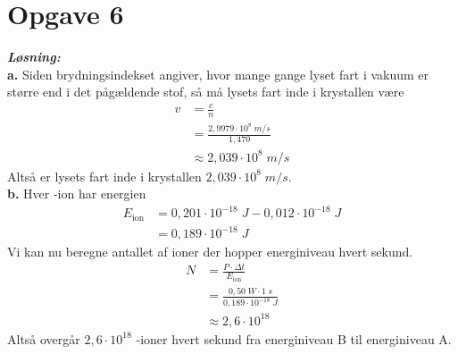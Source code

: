 \documentclass{report}
\newcommand{\sol}{\setlength{\parindent}{0cm}\textbf{\textit{Løsning:}}\setlength{\parindent}{1cm}}
\begin{document}
\section*{Opgave 6}
\sol \\
\textbf{a.}
Siden brydningsindekset angiver, hvor mange gange lyset fart i vakuum er større end i det pågældende stof, så må lysets fart inde i krystallen være 
\begin{equation*}
\begin{split}
  v&=\frac{c}{n}\\ 
  &=\frac{2,9979 \cdot 10^8 \;\unit{m/s} }{1,470}\\ 
  &\approx 2,039 \cdot 10^8 \;\unit{m/s} 
\end{split}
\end{equation*}
Altså er lysets fart inde i krystallen $2,039 \cdot 10^8 \;\unit{m/s} $.\\[1ex]
\textbf{b.}
Hver -ion har energien 
\begin{equation*}
\begin{split}
E_{\text{ion} }&=0,201 \cdot 10^{-18} \;\unit{J} -0,012 \cdot 10^{-18} \;\unit{J} \\ 
  &=0,189 \cdot 10^{-18}\;\unit{J} 
\end{split}
\end{equation*}
Vi kan nu beregne antallet af ioner der hopper energiniveau hvert sekund.
\begin{equation*}
\begin{split}
  N&=\frac{P \cdot \Delta t}{E_{\text{ion} }}\\ 
  &=\frac{0,50 \;\unit{W} \cdot 1 \;\unit{s} }{0,189 \cdot 10^{-18}\;\unit{J} }\\ 
  &\approx 2,6 \cdot 10^{18} 
\end{split}
\end{equation*}
Altså overgår $2,6 \cdot 10^{18}$ -ioner hvert sekund fra energiniveau B til energiniveau A.
\end{document}

